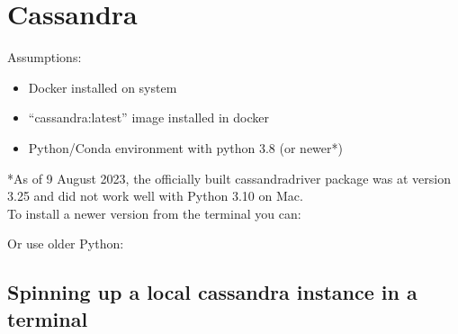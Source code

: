 \documentclass[letterpaper,10pt,english]{jupyterBook}
\begin{document}
\section{Cassandra}
\label{\detokenize{2_Data_sources/Databases/Cassandra:cassandra}}\label{\detokenize{2_Data_sources/Databases/Cassandra::doc}}
\sphinxAtStartPar
Assumptions:
\begin{itemize}
\item {} 
\sphinxAtStartPar
Docker installed on system

\item {} 
\sphinxAtStartPar
“cassandra:latest” image installed in docker

\item {} 
\sphinxAtStartPar
Python/Conda environment with python 3.8 (or newer*)

\end{itemize}

\sphinxAtStartPar
*As of 9 August 2023, the officially built cassandra\sphinxhyphen{}driver package was at version 3.25 and did not work well with Python 3.10 on Mac.\\
To install a newer version from the terminal you can:

\begin{sphinxVerbatim}[commandchars=\\\{\}]
  
  
\end{sphinxVerbatim}

\sphinxAtStartPar
Or use older Python:

\begin{sphinxVerbatim}[commandchars=\\\{\}]
      
    
   
\end{sphinxVerbatim}


\subsection{Spinning up a local cassandra instance in a terminal}
\label{\detokenize{2_Data_sources/Databases/Cassandra:spinning-up-a-local-cassandra-instance-in-a-terminal}}
\sphinxAtStartPar
{}
\end{document}
